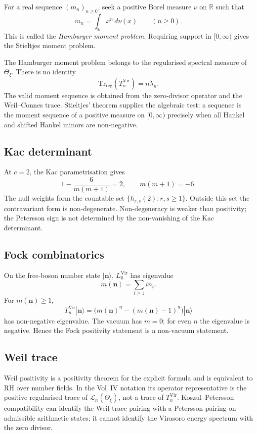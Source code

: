 For a real sequence \((m_n)_{n\geq0}\), seek a positive Borel
measure \(\nu\) on \(\mathbb R\) such that
\[
                         m_n=\int_{\mathbb R}x^n\,d\nu(x)
                         \qquad(n\geq0).
\]
This is called the \emph{Hamburger moment problem}.
Requiring support in \([0,\infty)\) gives the Stieltjes moment problem.

The Hamburger moment problem belongs to the regularised spectral
measure of \(\Theta_{\xi}\). There is no identity
\[
\mathrm{Tr}_{\mathrm{reg}}(T_{n}^{\mathrm{Vir}})=n\lambda_{n}.
\]
The valid moment sequence is obtained from the zero-divisor operator and the
Weil--Connes trace. Stieltjes' theorem supplies the algebraic test:
a sequence is the moment sequence of a positive measure on
\([0,\infty)\) precisely when all Hankel and shifted Hankel minors are
non-negative.

\subsection{Kac determinant}
\label{v4-arith:vb:cycle:A3}

At \(c=2\), the Kac parametrisation gives
\[
1-\frac{6}{m(m+1)}=2,\qquad m(m+1)=-6.
\]
The null weights form the countable set
\(\{h_{r,s}(2):r,s\geq1\}\). Outside this set the contravariant form
is non-degenerate. Non-degeneracy is weaker than positivity; the
Petersson sign is not determined by the non-vanishing of the Kac
determinant.

\subsection{Fock combinatorics}
\label{v4-arith:vb:cycle:A4}

On the free-boson number state
\(|\mathbf n\rangle\), \(L_{0}^{\mathrm{Vir}}\) has eigenvalue
\[
m(\mathbf n)=\sum_{i\geq1}i n_i .
\]
For \(m(\mathbf n)\geq1\),
\[
T_{n}^{\mathrm{Vir}}|\mathbf n\rangle
=\bigl(m(\mathbf n)^n-(m(\mathbf n)-1)^n\bigr)|\mathbf n\rangle
\]
has non-negative eigenvalue. The vacuum has \(m=0\); for even \(n\)
the eigenvalue is negative. Hence the Fock positivity statement is a
non-vacuum statement.

\subsection{Weil trace}
\label{v4-arith:vb:cycle:A5}

Weil positivity is a positivity theorem for the explicit formula and
is equivalent to RH over number fields. In the Vol~IV notation its
operator representative is the positive regularised trace of
\(\mathcal L_n(\Theta_{\xi})\), not a trace of
\(T_n^{\mathrm{Vir}}\). Koszul--Petersson compatibility can identify
the Weil trace pairing with a Petersson pairing on admissible
arithmetic states; it cannot identify the Virasoro energy spectrum
with the zero divisor.

